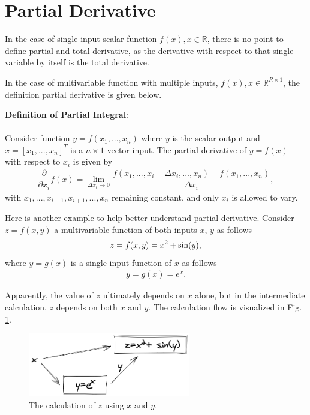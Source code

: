 \section{Partial Derivative} \label{ch6sec:partialtotalderivative}

In the case of single input scalar function $f(x), x \in \mathbb{R}$, there is no point to define partial and total derivative, as the derivative with respect to that single variable by itself is the total derivative.

In the case of multivariable function with multiple inputs, $f(x), x \in \mathbb{R}^{R\times 1}$, the definition partial derivative is given below.

\begin{VF}
	\textbf{Definition of Partial Integral}:
	\\
	\\
	Consider function $y = f(x_1,...,x_n)$ where $y$ is the scalar output and $x = \left[x_1, ..., x_n\right]^T$ is a $n\times 1$ vector input. The partial derivative of $y=f(x)$ with respect to $x_i$ is given by
	\begin{eqnarray}
		\dfrac{\partial}{\partial x_i}f(x) = \lim_{\Delta x_i \rightarrow 0} \dfrac{f(x_1,..., x_i + \Delta x_i,...,x_n)-f(x_1,...,x_n)}{\Delta x_i}, \label{ch6eq:formalpartialderivative}
	\end{eqnarray}
	with $x_1,...,x_{i-1}, x_{i+1},..., x_n$ remaining constant, and only $x_i$ is allowed to vary.
	
\end{VF}

Here is another example to help better understand partial derivative. Consider $z=f(x, y)$ a multivariable function of both inputs $x$, $y$ as follows
\begin{eqnarray}
	z = f(x,y) = x^2 + \textup{sin}(y), \label{ch6eq:partialdiffchainexp1}
\end{eqnarray}
where $y = g(x)$ is a single input function of $x$ as follows
\begin{eqnarray}
	y = g(x) = e^x. \label{ch6eq:partialdiffchainexp2}
\end{eqnarray}

Apparently, the value of $z$ ultimately depends on $x$ alone, but in the intermediate calculation, $z$ depends on both $x$ and $y$. The calculation flow is visualized in Fig. \ref{ch6fig_chainexp}.

\begin{figure}
	\centering
	\includegraphics[width=200pt]{chapters/chapter6/figures/chainexp.png}
	\caption{The calculation of $z$ using $x$ and $y$.} \label{ch6fig_chainexp}
\end{figure}

